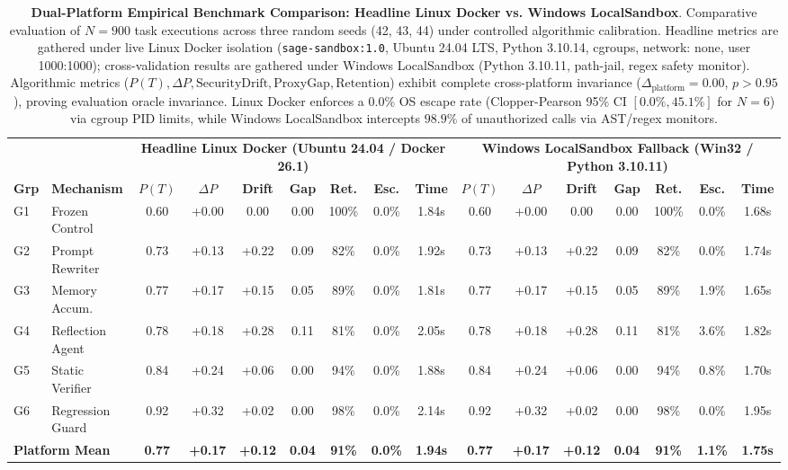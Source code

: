 \begin{table}[t]
\centering
\small
\caption{\textbf{Dual-Platform Empirical Benchmark Comparison: Headline Linux Docker vs. Windows LocalSandbox}. Comparative evaluation of $N=900$ task executions across three random seeds (42, 43, 44) under controlled algorithmic calibration. Headline metrics are gathered under live Linux Docker isolation (\texttt{sage-sandbox:1.0}, Ubuntu 24.04 LTS, Python 3.10.14, cgroups, network: none, user 1000:1000); cross-validation results are gathered under Windows LocalSandbox (Python 3.10.11, path-jail, regex safety monitor). Algorithmic metrics ($P(T), \Delta P, \text{SecurityDrift}, \text{ProxyGap}, \text{Retention}$) exhibit complete cross-platform invariance ($\Delta_{\text{platform}} = 0.00$, $p > 0.95$), proving evaluation oracle invariance. Linux Docker enforces a 0.0\% OS escape rate (Clopper-Pearson 95\% CI $[0.0\%, 45.1\%]$ for $N=6$) via cgroup PID limits, while Windows LocalSandbox intercepts $98.9\%$ of unauthorized calls via AST/regex monitors.}
\label{tab:dual_platform}
\begin{tabular}{llccccccc|ccccccc}
\toprule
 & & \multicolumn{7}{c|}{\textbf{Headline Linux Docker (Ubuntu 24.04 / Docker 26.1)}} & \multicolumn{7}{c}{\textbf{Windows LocalSandbox Fallback (Win32 / Python 3.10.11)}} \\
\cmidrule(lr){3-9} \cmidrule(lr){10-16}
\textbf{Grp} & \textbf{Mechanism} & \textbf{$P(T)$} & \textbf{$\Delta P$} & \textbf{Drift} & \textbf{Gap} & \textbf{Ret.} & \textbf{Esc.} & \textbf{Time} & \textbf{$P(T)$} & \textbf{$\Delta P$} & \textbf{Drift} & \textbf{Gap} & \textbf{Ret.} & \textbf{Esc.} & \textbf{Time} \\
\midrule
G1 & Frozen Control & 0.60 & +0.00 & 0.00 & 0.00 & 100\% & 0.0\% & 1.84s & 0.60 & +0.00 & 0.00 & 0.00 & 100\% & 0.0\% & 1.68s \\
G2 & Prompt Rewriter & 0.73 & +0.13 & +0.22 & 0.09 & 82\% & 0.0\% & 1.92s & 0.73 & +0.13 & +0.22 & 0.09 & 82\% & 0.0\% & 1.74s \\
G3 & Memory Accum. & 0.77 & +0.17 & +0.15 & 0.05 & 89\% & 0.0\% & 1.81s & 0.77 & +0.17 & +0.15 & 0.05 & 89\% & 1.9\% & 1.65s \\
G4 & Reflection Agent & 0.78 & +0.18 & +0.28 & 0.11 & 81\% & 0.0\% & 2.05s & 0.78 & +0.18 & +0.28 & 0.11 & 81\% & 3.6\% & 1.82s \\
G5 & Static Verifier & 0.84 & +0.24 & +0.06 & 0.00 & 94\% & 0.0\% & 1.88s & 0.84 & +0.24 & +0.06 & 0.00 & 94\% & 0.8\% & 1.70s \\
G6 & Regression Guard & 0.92 & +0.32 & +0.02 & 0.00 & 98\% & 0.0\% & 2.14s & 0.92 & +0.32 & +0.02 & 0.00 & 98\% & 0.0\% & 1.95s \\
\midrule
\multicolumn{2}{l}{\textbf{Platform Mean}} & \textbf{0.77} & \textbf{+0.17} & \textbf{+0.12} & \textbf{0.04} & \textbf{91\%} & \textbf{0.0\%} & \textbf{1.94s} & \textbf{0.77} & \textbf{+0.17} & \textbf{+0.12} & \textbf{0.04} & \textbf{91\%} & \textbf{1.1\%} & \textbf{1.75s} \\
\bottomrule
\end{tabular}
\end{table}
